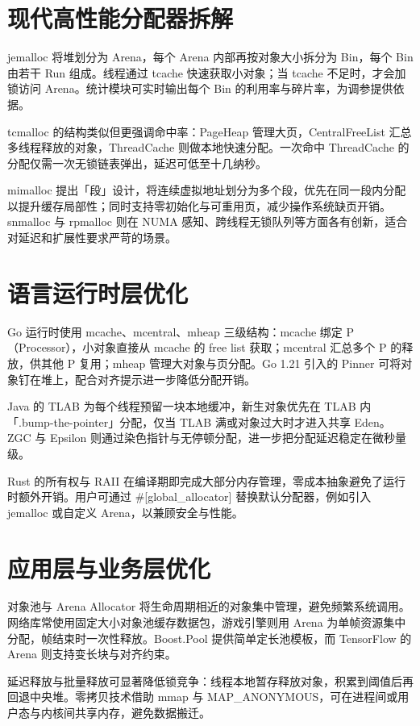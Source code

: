 \chapter{现代高性能分配器拆解}
jemalloc 将堆划分为 Arena，每个 Arena 内部再按对象大小拆分为 Bin，每个 Bin 由若干 Run 组成。线程通过 tcache 快速获取小对象；当 tcache 不足时，才会加锁访问 Arena。统计模块可实时输出每个 Bin 的利用率与碎片率，为调参提供依据。\par
tcmalloc 的结构类似但更强调命中率：PageHeap 管理大页，CentralFreeList 汇总多线程释放的对象，ThreadCache 则做本地快速分配。一次命中 ThreadCache 的分配仅需一次无锁链表弹出，延迟可低至十几纳秒。\par
mimalloc 提出「段」设计，将连续虚拟地址划分为多个段，优先在同一段内分配以提升缓存局部性；同时支持零初始化与可重用页，减少操作系统缺页开销。snmalloc 与 rpmalloc 则在 NUMA 感知、跨线程无锁队列等方面各有创新，适合对延迟和扩展性要求严苛的场景。\par
\chapter{语言运行时层优化}
Go 运行时使用 mcache、mcentral、mheap 三级结构：mcache 绑定 P（Processor），小对象直接从 mcache 的 free list 获取；mcentral 汇总多个 P 的释放，供其他 P 复用；mheap 管理大对象与页分配。Go 1.21 引入的 Pinner 可将对象钉在堆上，配合对齐提示进一步降低分配开销。\par
Java 的 TLAB 为每个线程预留一块本地缓冲，新生对象优先在 TLAB 内「.bump-the-pointer」分配，仅当 TLAB 满或对象过大时才进入共享 Eden。ZGC 与 Epsilon 则通过染色指针与无停顿分配，进一步把分配延迟稳定在微秒量级。\par
Rust 的所有权与 RAII 在编译期即完成大部分内存管理，零成本抽象避免了运行时额外开销。用户可通过 \#{}[global\_{}allocator] 替换默认分配器，例如引入 jemalloc 或自定义 Arena，以兼顾安全与性能。\par
\chapter{应用层与业务层优化}
对象池与 Arena Allocator 将生命周期相近的对象集中管理，避免频繁系统调用。网络库常使用固定大小对象池缓存数据包，游戏引擎则用 Arena 为单帧资源集中分配，帧结束时一次性释放。Boost.Pool 提供简单定长池模板，而 TensorFlow 的 Arena 则支持变长块与对齐约束。\par
延迟释放与批量释放可显著降低锁竞争：线程本地暂存释放对象，积累到阈值后再回退中央堆。零拷贝技术借助 mmap 与 MAP\_{}ANONYMOUS，可在进程间或用户态与内核间共享内存，避免数据搬迁。\par
